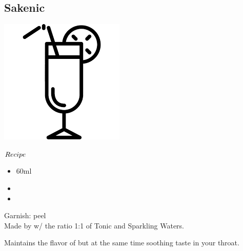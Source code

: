 \subsection{Sakenic}
\vspace{-7.6mm}
\hspace{30mm}
\includegraphics[scale=.07]{cocktail_glass_tall.png}
\vspace{2.5mm}
\begin{itembox}[l]{\boldmath $Recipe$}
\begin{itemize}
\setlength{\parskip}{0cm}
\setlength{\itemsep}{0cm}
\item \sake 60ml
\item \tw
\item \soda
\end{itemize}
\vspace{-4mm}
Garnish: \orange peel\\
Made by \build w/ the ratio 1:1 of Tonic and Sparkling Waters.
\end{itembox}
Maintains the flavor of \sake but at the same time soothing taste in your throat.
